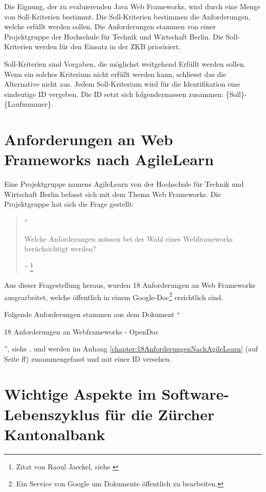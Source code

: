   Die Eignung, der zu evaluierenden Java Web Frameworks, wird durch eine Menge
  von Soll-Kriterien bestimmt. Die Soll-Kriterien bestimmen die Anforderungen,
  welche erfüllt werden sollen. Die Anforderungen stammen von einer
  Projektgruppe der Hochschule für Technik und Wirtschaft Berlin. Die
  Soll-Kriterien werden für den Einsatz in der \ac{ZKB} priorisiert.
  
  Soll-Kriterien sind Vorgaben, die möglichst weitgehend Erfüllt werden sollen.
  Wenn ein solches Kriterium nicht erfüllt werden kann, schliesst das die
  Alternative nicht aus. Jedem Soll-Kriterium wird für die Identifikation eine
  eindeutige ID vergeben. Die ID setzt sich folgendermassen zusammen: 
  \{Soll\}-\{Laufnummer\}.
  
  \section{Anforderungen an Web Frameworks nach AgileLearn}
  
  Eine Projektgruppe namens AgileLearn von der Hochschule für Technik und
  Wirtschaft Berlin befasst sich mit dem Thema Web Frameworks. Die
  Projektgruppe hat sich die Frage gestellt:
  
  \begin{quote}``\begin{itshape}Welche Anforderungen müssen bei der Wahl eines
  Webframeworks berücksichtigt werden?\end{itshape}'' \footnote{Zitat von Raoul
  Jaeckel, siehe \cite{AnforderungenAnWebframeworks}}
  \end{quote}
  
  Aus dieser Fragestellung heraus, wurden 18 Anforderungen an Web Frameworks
  ausgearbeitet, welche öffentlich in einem Google-Doc\footnote{Ein Service von
  Google um Dokumente öffentlich zu bearbeiten.} ersichtlich sind.
  
  Folgende Anforderungen stammen aus dem Dokument ``\begin{itshape}18
  Anforderungen an Webframeworks -
  OpenDoc\end{itshape}'', siehe \cite{AnforderungenAnWebframeworks}, und werden
  im Anhang \ref{chapter:18AnforderungenNachAgileLearn}
   (auf Seite
  \pageref{chapter:18AnforderungenNachAgileLearn}ff) zusammengefasst und mit
  einer ID versehen.
    
  \section{Wichtige Aspekte im Software-Lebenszyklus für die Zürcher
  Kantonalbank}
  

